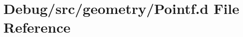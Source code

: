 \hypertarget{_pointf_8d}{}\section{Debug/src/geometry/\+Pointf.d File Reference}
\label{_pointf_8d}
